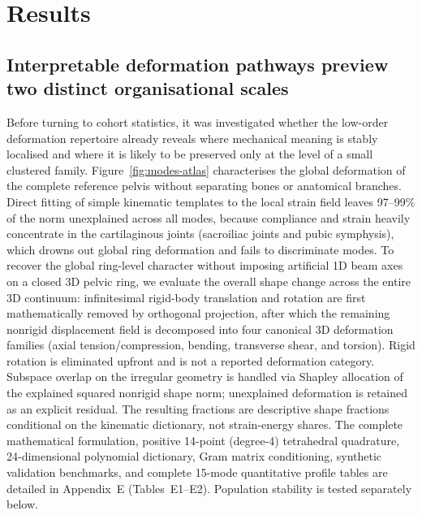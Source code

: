 \documentclass[11pt]{article}
\begin{document}
\section{Results}
\label{sec:results}

\subsection{Interpretable deformation pathways preview two distinct organisational scales}
\label{sec:atlas-results}

Before turning to cohort statistics, it was investigated whether the low-order deformation repertoire already reveals where mechanical meaning is stably localised and where it is likely to be preserved only at the level of a small clustered family.
Figure~\ref{fig:modes-atlas} characterises the global deformation of the complete reference pelvis without separating bones or anatomical branches.
Direct fitting of simple kinematic templates to the local strain field leaves 97--99\% of the norm unexplained across all modes, because compliance and strain heavily concentrate in the cartilaginous joints (sacroiliac joints and pubic symphysis), which drowns out global ring deformation and fails to discriminate modes.
To recover the global ring-level character without imposing artificial 1D beam axes on a closed 3D pelvic ring, we evaluate the overall shape change across the entire 3D continuum: infinitesimal rigid-body translation and rotation are first mathematically removed by orthogonal projection, after which the remaining nonrigid displacement field is decomposed into four canonical 3D deformation families (axial tension/compression, bending, transverse shear, and torsion).
Rigid rotation is eliminated upfront and is not a reported deformation category.
Subspace overlap on the irregular geometry is handled via Shapley allocation of the explained squared nonrigid shape norm; unexplained deformation is retained as an explicit residual.
The resulting fractions are descriptive shape fractions conditional on the kinematic dictionary, not strain-energy shares.
The complete mathematical formulation, positive 14-point (degree-4) tetrahedral quadrature, 24-dimensional polynomial dictionary, Gram matrix conditioning, synthetic validation benchmarks, and complete 15-mode quantitative profile tables are detailed in Appendix~E (Tables~E1--E2).
Population stability is tested separately below.
\end{document}
